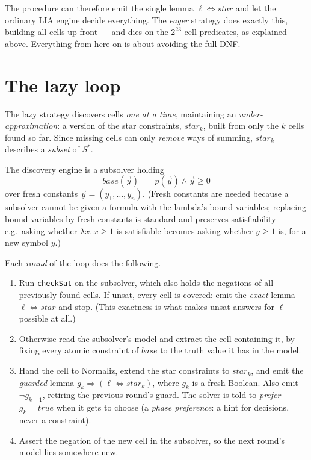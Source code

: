 \documentclass[11pt]{article}
\newcommand{\normaliz}{\textsf{Normaliz}\xspace}
\newcommand{\Sstar}{\ensuremath{S^{*}}}
\newcommand{\vy}{\ensuremath{\vec{y}}\xspace}
\newcommand{\true}{\ensuremath{\mathit{true}}\xspace}
\begin{document}
The procedure can therefore emit the single lemma
$\ell \Leftrightarrow \mathit{star}$ and let the ordinary LIA engine decide
everything. The \emph{eager} strategy does exactly this, building all
cells up front --- and dies on the $2^{23}$-cell predicates, as explained
above. Everything from here on is about avoiding the full DNF.

\section{The lazy loop}

The lazy strategy discovers cells \emph{one at a time}, maintaining an
\emph{under-approximation}: a version of the star constraints,
$\mathit{star}_k$, built from only the $k$ cells found so far. Since
missing cells can only \emph{remove} ways of summing,
$\mathit{star}_k$ describes a \emph{subset} of $\Sstar$.

The discovery engine is a subsolver holding
\[
\mathit{base}(\vy) \;=\; p(\vy) \wedge \vy \ge 0
\]
over fresh constants $\vy = (y_1,\ldots,y_n)$. (Fresh constants are needed
because a subsolver cannot be given a formula with the lambda's bound
variables; replacing bound variables by fresh constants is standard and
preserves satisfiability --- e.g.\ asking whether $\lambda x.\,x{\ge}1$ is
satisfiable becomes asking whether $y \ge 1$ is, for a new symbol $y$.)

Each \emph{round} of the loop does the following.

\begin{enumerate}
\item Run \texttt{checkSat} on the subsolver, which also holds the
  negations of all previously found cells. If \textsf{unsat}, every cell is
  covered: emit the \emph{exact} lemma $\ell \Leftrightarrow \mathit{star}$
  and stop. (This exactness is what makes \textsf{unsat} answers for $\ell$
  possible at all.)
\item Otherwise read the subsolver's model and extract the cell containing
  it, by fixing every atomic constraint of $\mathit{base}$ to the truth
  value it has in the model.
\item Hand the cell to \normaliz, extend the star constraints to
  $\mathit{star}_k$, and emit the \emph{guarded} lemma
  $g_k \Rightarrow (\ell \Leftrightarrow \mathit{star}_k)$, where $g_k$ is
  a fresh Boolean. Also emit $\neg g_{k-1}$, retiring the previous round's
  guard. The solver is told to \emph{prefer} $g_k = \true$ when it gets to
  choose (a \emph{phase preference}: a hint for decisions, never a
  constraint).
\item Assert the negation of the new cell in the subsolver, so the next
  round's model lies somewhere new.
\end{enumerate}
\end{document}
